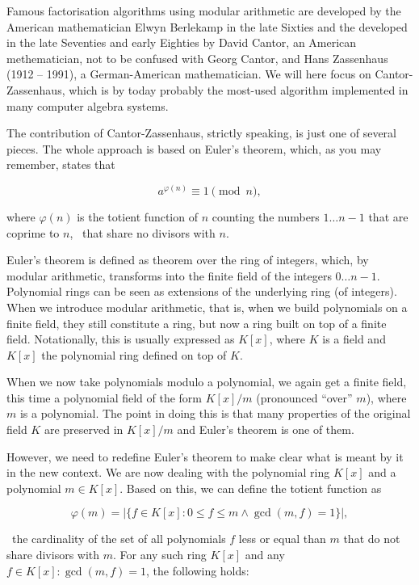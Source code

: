 \documentclass[tikz]{scrreprt}
\begin{document}
Famous factorisation algorithms using modular
arithmetic are 
developed by the American mathematician 
Elwyn Berlekamp in the late Sixties
and the 
developed in the late Seventies and early Eighties
by David Cantor, an American methematician,
not to be confused with Georg Cantor, and
Hans Zassenhaus (1912 -- 1991), a German-American
mathematician.
We will here focus on Cantor-Zassenhaus,
which is by today probably the most-used algorithm
implemented in many computer algebra systems.

The contribution of Cantor-Zassenhaus, strictly speaking,
is just one of several pieces. The whole approach is
based on Euler's theorem,
which, as you may remember, states that

\begin{equation}
a^{\varphi(n)} \equiv 1 \pmod{n},
\end{equation}

where $\varphi(n)$ is the totient function
of $n$ counting the numbers $1\dots n-1$ that
are coprime to $n$, \ie\ that share no divisors with $n$.

Euler's theorem is defined as theorem over the ring
of integers, which, by modular arithmetic, transforms
into the finite field of the integers $0\dots n-1$.
Polynomial rings can be seen as extensions
of the underlying ring (of integers).
When we introduce modular arithmetic,
that is, when we build polynomials on 
a finite field, they still
constitute a ring, but now a ring built on top of a finite field.
Notationally, this is usually expressed as $K[x]$,
where $K$ is a field and $K[x]$ the polynomial ring
defined on top of $K$.

When we now take polynomials modulo a polynomial,
we again get a finite field, this time a polynomial field
of the form $K[x]/m$ (pronounced ``over'' $m$),
where $m$ is a polynomial.
The point in doing this is that many properties of
the original field $K$ are preserved in $K[x]/m$ and
Euler's theorem is one of them.

However, we need to redefine Euler's theorem
to make clear what is meant by it in the new context.
We are now dealing with the polynomial ring $K[x]$
and a polynomial $m \in K[x]$.
Based on this, we can define the totient function as

\[
\varphi(m) = |\lbrace f \in K[x] : 0 \le f \le m \wedge \gcd(m,f) = 1\rbrace|,
\]

\ie\ the cardinality of the set of all polynomials $f$
less or equal than $m$ that do not share
divisors with $m$. For any such ring $K[x]$
and any $f \in K[x] : \gcd(m,f) = 1$,
the following holds:
\end{document}
